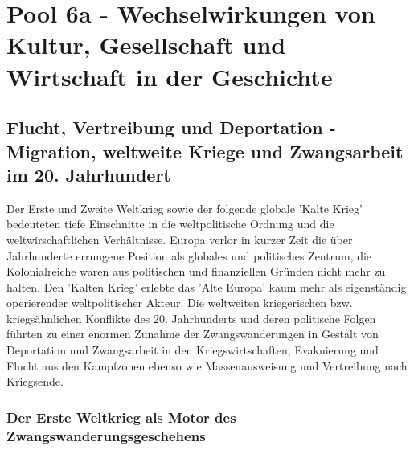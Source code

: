\documentclass[letterpaper, 12pt]{article}
\let\tempsection\section
\renewcommand\section[1]{\vspace{-0.3cm}\tempsection{#1}\vspace{-0.3cm}}
\let\tempsubsection\subsection
\renewcommand\subsection[1]{\vspace{0cm}\tempsubsection{#1}\vspace{0cm}}
\let\tempsubsubsection\subsubsection
\renewcommand\subsubsection[1]{\vspace{0cm}\tempsubsubsection{#1}\vspace{0cm}}
\begin{document}
\parindent 0pt
\parskip 6pt



\clearpage
\thispagestyle{empty}
\tableofcontents

\newpage
{}
\pagestyle{fancy}


\section{Pool 6a - Wechselwirkungen von Kultur, Gesellschaft und Wirtschaft in der Geschichte \cite{buch}}

\subsection{Flucht, Vertreibung und Deportation - Migration, weltweite Kriege und Zwangsarbeit im 20. Jahrhundert}

Der Erste und Zweite Weltkrieg sowie der folgende globale 'Kalte Krieg' bedeuteten tiefe Einschnitte in die weltpolitische Ordnung und die weltwirschaftlichen Verhältnisse. Europa verlor in kurzer Zeit die über Jahrhunderte errungene Position als globales und politisches Zentrum, die Kolonialreiche waren aus politischen und finanziellen Gründen nicht mehr zu halten. Den 'Kalten Krieg' erlebte das 'Alte Europa' kaum mehr als eigenständig operierender weltpolitischer Akteur. Die weltweiten kriegerischen bzw. kriegsähnlichen Konflikte des 20. Jahrhunderts und deren politische Folgen führten zu einer enormen Zunahme der Zwangswanderungen in Gestalt von Deportation und Zwangsarbeit in den Kriegswirtschaften, Evakuierung und Flucht aus den Kampfzonen ebenso wie Massenausweisung und Vertreibung nach Kriegsende.

\subsubsection{Der Erste Weltkrieg als Motor des Zwangswanderungsgeschehens}
\end{document}
